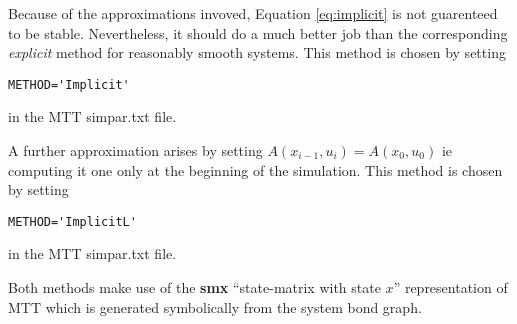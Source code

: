 Because of the approximations invoved, Equation \ref{eq:implicit} is
not guarenteed to be stable. Nevertheless, it should do a much better
job than the corresponding \emph{explicit} method for reasonably
smooth systems.
This method is chosen by setting 
\begin{verbatim}
METHOD='Implicit'
\end{verbatim}
in the MTT simpar.txt file.

A further approximation arises by setting  $A(x_{i-1},u_i) =
A(x_{0},u_0)$ ie computing it one only at the beginning of the
simulation.
This method is chosen by setting 
\begin{verbatim}
METHOD='ImplicitL'
\end{verbatim}
in the MTT simpar.txt file.

Both methods make use of the \textbf{smx} ``state-matrix with state $x$''
representation of MTT which is generated symbolically from the system
bond graph.

